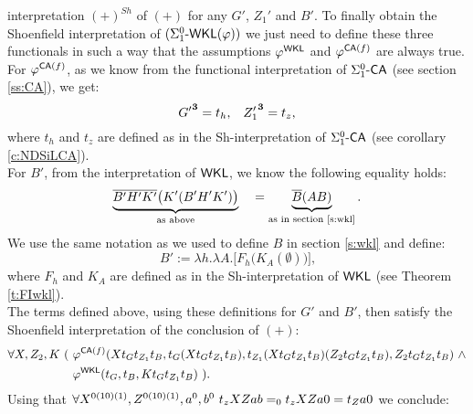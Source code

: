 interpretation $(+)^{Sh}$ of $(+)$ 
for any $G'$, $Z_1'$ and $B'$. To finally obtain
the Shoenfield interpretation of $(\Sigma^0_1\textsf{\upshape -}\textsf{\upshape WKL}(\varphi))$ we just need to 
define these three functionals in such a way that the 
assumptions $\varphi^{\textsf{\upshape WKL}}$ and $\varphi^{\textsf{\upshape CA}(f)}$ are always true.\\
For $\varphi^{\textsf{\upshape CA}(f)}$, as we know from the functional interpretation of 
$\Sigma^0_1\textsf{\upshape -}\textsf{\upshape CA}$ 
(see section \ref{ss:CA}), we get:
\[
      {G'}^\mathbf{3}=t_h \text{,}\quad
      {Z_1'}^\mathbf{3}=t_z\text{,} 
\]
where $t_h$ and $t_z$ are defined as in the Sh-interpretation of $\Sigma^0_1\textsf{\upshape -}\textsf{\upshape CA}$ 
(see corollary \ref{c:NDSiLCA}).\\
For $B'$, from the interpretation of $\textsf{\upshape WKL}$, we know the following
equality holds:
\[ 
\underbrace{\overline {B'H'K'}\big(K'(B'H'K')\big)}_{\text{as above}}\quad = 
\underbrace{\overline{B}(AB)}_{\text{as in section \ref{s:wkl}}} 
\text{.} 
\]
We use the same notation as we used to define $B$ in section \ref{s:wkl} 
and define:
\[
        B':=\lambda h.\lambda A.\big[F_h\big(K_{A}(\emptyset)\big)\big] 
\text{,}
\]
where $F_h$ and $K_A$ are defined as in the Sh-interpretation of $\textsf{\upshape WKL}$
(see Theorem \ref{t:FIwkl}).\\
The terms defined above, using these definitions for $G'$ and $B'$, then 
satisfy the Shoenfield interpretation of the conclusion of $(+):$
\begin{align*}
\forall X,Z_2,K\ (\ &\varphi^{\textsf{\upshape CA}(f)}(
 Xt_{G}t_{Z_1}t_{B},
 t_{G}(Xt_{G}t_{Z_1}t_{B}),
 t_{Z_1}( Xt_{G}t_{Z_1}t_{B} )( Z_2t_Gt_{Z_1}t_{B} ),
 Z_2t_Gt_{Z_1}t_{B})\ \wedge\\
 &\varphi^{\textsf{\upshape WKL}}(t_{G},t_{B},Kt_{G}t_{Z_1}t_{B})\ ) \text{.}
\end{align*}
Using that 
$\forall X^{0(10)(1)},Z^{0(10)(1)},a^0,b^0\ t_zXZab=_0t_zXZa0 = t_Za0$ 
we conclude:
